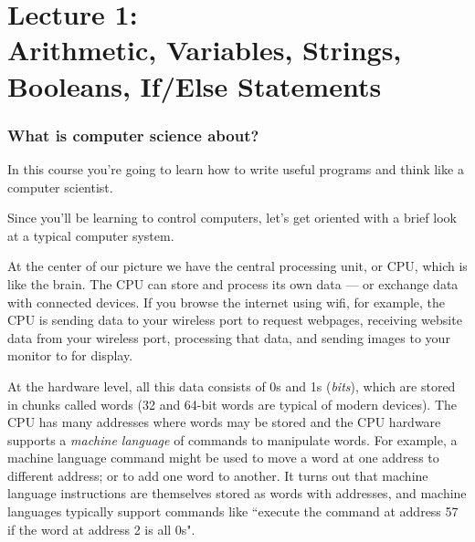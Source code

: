 
\part*{Lecture 1: \\Arithmetic, Variables, Strings, Booleans, If/Else Statements}


\section*{What is computer science about?}

In this course you’re going to learn how to write useful programs and think like a computer scientist.

Since you’ll be learning to control computers, let’s get oriented with a brief look at a typical computer system. 


At the center of our picture we have the central processing unit, or CPU, which is like the brain. The CPU can store and process its own data --- or exchange data with connected devices. If you browse the internet using wifi, for example, the CPU is sending data to your wireless port to request webpages, receiving website data from your wireless port, processing that data, and sending images to your monitor to for display. 

At the hardware level, all this data consists of 0s and 1s (\emph{bits}), which are stored in chunks called words (32 and 64-bit words are typical of modern devices). The CPU has many addresses where words may be stored and the CPU hardware supports a \emph{machine language} of commands to manipulate words. For example, a machine language command might be used 
to move a word at one address to different address; or to add one word to another. It turns out that machine language instructions are themselves stored as words with addresses, and machine languages typically support commands like ``execute the command at address 57 if the word at address 2 is all 0s". 


